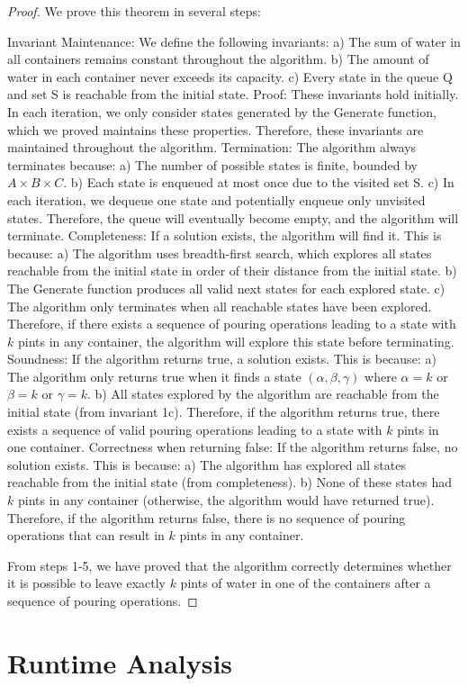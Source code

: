 \documentclass{article}
\begin{document}
\begin{proof}
We prove this theorem in several steps:

Invariant Maintenance:
We define the following invariants:
a) The sum of water in all containers remains constant throughout the algorithm.
b) The amount of water in each container never exceeds its capacity.
c) Every state in the queue Q and set S is reachable from the initial state.
Proof: These invariants hold initially. In each iteration, we only consider states generated by the Generate function, which we proved maintains these properties. Therefore, these invariants are maintained throughout the algorithm.
Termination:
The algorithm always terminates because:
a) The number of possible states is finite, bounded by $A \times B \times C$.
b) Each state is enqueued at most once due to the visited set S.
c) In each iteration, we dequeue one state and potentially enqueue only unvisited states.
Therefore, the queue will eventually become empty, and the algorithm will terminate.
Completeness:
If a solution exists, the algorithm will find it. This is because:
a) The algorithm uses breadth-first search, which explores all states reachable from the initial state in order of their distance from the initial state.
b) The Generate function produces all valid next states for each explored state.
c) The algorithm only terminates when all reachable states have been explored.
Therefore, if there exists a sequence of pouring operations leading to a state with $k$ pints in any container, the algorithm will explore this state before terminating.
Soundness:
If the algorithm returns true, a solution exists. This is because:
a) The algorithm only returns true when it finds a state $(\alpha, \beta, \gamma)$ where $\alpha = k$ or $\beta = k$ or $\gamma = k$.
b) All states explored by the algorithm are reachable from the initial state (from invariant 1c).
Therefore, if the algorithm returns true, there exists a sequence of valid pouring operations leading to a state with $k$ pints in one container.
Correctness when returning false:
If the algorithm returns false, no solution exists. This is because:
a) The algorithm has explored all states reachable from the initial state (from completeness).
b) None of these states had $k$ pints in any container (otherwise, the algorithm would have returned true).
Therefore, if the algorithm returns false, there is no sequence of pouring operations that can result in $k$ pints in any container.

From steps 1-5, we have proved that the algorithm correctly determines whether it is possible to leave exactly $k$ pints of water in one of the containers after a sequence of pouring operations.
\end{proof}

\section{Runtime Analysis}
\end{document}
